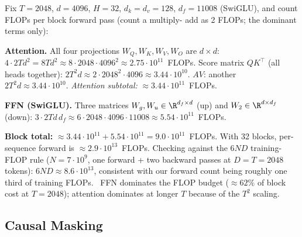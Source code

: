 \begin{workedexample}
Fix $T=2048$, $d=4096$, $H=32$, $d_k=d_v=128$, $d_f = 11008$
(SwiGLU), and count FLOPs per block forward pass (count a multiply-
add as 2 FLOPs; the dominant terms only):

\textbf{Attention.} All four projections $W_Q,W_K,W_V,W_O$ are
$d \times d$: $4 \cdot 2 T d^2 = 8 T d^2 \approx 8 \cdot 2048 \cdot
4096^2 \approx 2.75 \cdot 10^{11}$~FLOPs.
Score matrix $Q K^{\top}$ (all heads together): $2 T^2 d
\approx 2 \cdot 2048^2 \cdot 4096 \approx 3.44 \cdot 10^{10}$.
$A V$: another $2 T^2 d \approx 3.44 \cdot 10^{10}$.
\emph{Attention subtotal:} $\approx 3.44 \cdot 10^{11}$~FLOPs.

\textbf{FFN (SwiGLU).} Three matrices $W_g, W_u \in \R^{d_f\times d}$
(up) and $W_2 \in \R^{d\times d_f}$ (down):
$3 \cdot 2 T d\, d_f \approx 6 \cdot 2048 \cdot 4096 \cdot 11008
\approx 5.54 \cdot 10^{11}$~FLOPs.

\textbf{Block total:} $\approx 3.44 \cdot 10^{11} + 5.54 \cdot
10^{11} = 9.0 \cdot 10^{11}$~FLOPs. With 32 blocks, per-sequence
forward is $\approx 2.9 \cdot 10^{13}$~FLOPs. Checking against the
$6ND$ training-FLOP rule ($N = 7 \cdot 10^9$, one forward + two
backward passes at $D = T = 2048$ tokens): $6ND \approx 8.6 \cdot
10^{13}$, consistent with our forward count being roughly one third
of training FLOPs. \Ident\ FFN dominates the FLOP budget
($\approx 62\%$ of block cost at $T=2048$); attention dominates at
longer $T$ because of the $T^2$ scaling.
\end{workedexample}

\subsection{Causal Masking}

